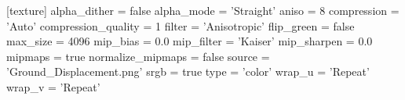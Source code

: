 [texture]
alpha_dither = false
alpha_mode = 'Straight'
aniso = 8
compression = 'Auto'
compression_quality = 1
filter = 'Anisotropic'
flip_green = false
max_size = 4096
mip_bias = 0.0
mip_filter = 'Kaiser'
mip_sharpen = 0.0
mipmaps = true
normalize_mipmaps = false
source = 'Ground_Displacement.png'
srgb = true
type = 'color'
wrap_u = 'Repeat'
wrap_v = 'Repeat'
